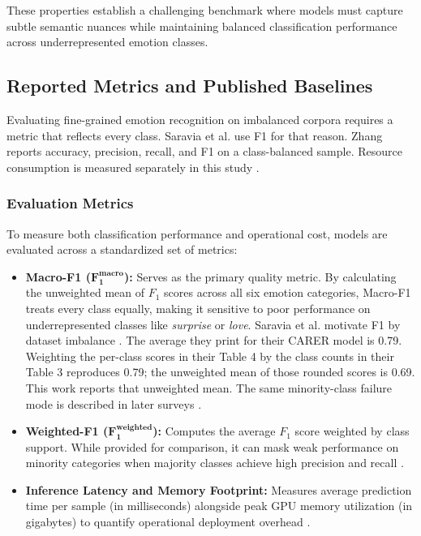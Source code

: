 \documentclass[conference]{IEEEtran}
\begin{document}
These properties establish a challenging benchmark where models must capture subtle semantic nuances while maintaining balanced 
classification performance across underrepresented emotion classes.

\subsection{Reported Metrics and Published Baselines}

Evaluating fine-grained emotion recognition on imbalanced corpora requires a metric that reflects every class. Saravia et al. \cite{saravia2018carer} use F1 for that reason. Zhang \cite{zhang2024comparative} reports accuracy, precision, recall, and F1 on a class-balanced sample. Resource consumption is measured separately in this study \cite{nwaiwu2025peft}.

\subsubsection{Evaluation Metrics}
To measure both classification performance and operational cost, models are evaluated across a standardized set of metrics:

\begin{itemize}
    \item \textbf{Macro-F1 ($\mathbf{F_1^{\text{macro}}}$):} Serves as the primary quality metric. By calculating the unweighted mean of $F_1$ scores across all six emotion categories, Macro-F1 treats every class equally, making it sensitive to poor performance on underrepresented classes like \textit{surprise} or \textit{love}. Saravia et al. motivate F1 by dataset imbalance \cite{saravia2018carer}. The average they print for their CARER model is 0.79. Weighting the per-class scores in their Table 4 by the class counts in their Table 3 reproduces 0.79; the unweighted mean of those rounded scores is 0.69. This work reports that unweighted mean. The same minority-class failure mode is described in later surveys \cite{maruf2024challenges}.
    \item \textbf{Weighted-F1 ($\mathbf{F_1^{\text{weighted}}}$):} Computes the average $F_1$ score weighted by class support. While provided for comparison, it can mask weak performance on minority categories when majority classes achieve high precision and recall \cite{chakriswaran2019emotion}.
    \item \textbf{Inference Latency and Memory Footprint:} Measures average prediction time per sample (in milliseconds) alongside peak GPU memory utilization (in gigabytes) to quantify operational deployment overhead \cite{nwaiwu2025peft}.
\end{itemize}
\end{document}
